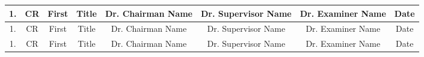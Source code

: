\begin{small}
\begin{longtable}{|c|c|c|c|c|c|c|c|}
	1. &										   %
	CR &									  	   %
	First &										   %
	Title  &							     	   %
	Dr. Chairman Name&						 	   %
	Dr. Supervisor Name&					 	   %
	Dr. Examiner Name&						  	   %
	Date \\ \hline										   %
	1. &										   %
	CR &									  	   %
	First &										   %
	Title  &							     	   %
	Dr. Chairman Name&						 	   %
	Dr. Supervisor Name&					 	   %
	Dr. Examiner Name&						  	   %
	Date \\ \hline										   %
	1. &										   %
	CR &									  	   %
	First &										   %
	Title  &							     	   %
	Dr. Chairman Name&						 	   %
	Dr. Supervisor Name&					 	   %
	Dr. Examiner Name&						  	   %
	Date \\ \hline										   %
\end{longtable}
\end{small}